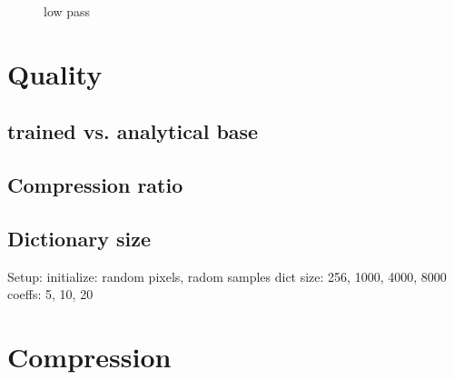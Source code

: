 
\begin{figure}
\centering
{}
\hspace{5mm}
\caption{low pass}

\label{fig:16_1000_lasso}
\end{figure}





\section{Quality}
\subsection*{trained vs. analytical base}
\subsection*{Compression ratio}
\subsection*{Dictionary size}
Setup:
  initialize: random pixels, radom samples 
  dict size: 256, 1000, 4000, 8000
  coeffs: 5, 10, 20

\section{Compression}







